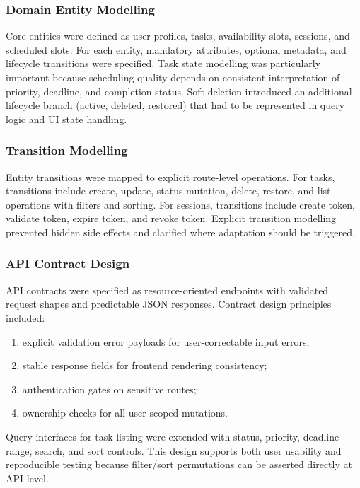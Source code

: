 \documentclass[12pt]{article}
\begin{document}
\subsubsection{Domain Entity Modelling}
Core entities were defined as user profiles, tasks, availability slots, sessions, and scheduled slots. For each entity, mandatory attributes, optional metadata, and lifecycle transitions were specified. Task state modelling was particularly important because scheduling quality depends on consistent interpretation of priority, deadline, and completion status. Soft deletion introduced an additional lifecycle branch (active, deleted, restored) that had to be represented in query logic and UI state handling.

\subsubsection{Transition Modelling}
Entity transitions were mapped to explicit route-level operations. For tasks, transitions include create, update, status mutation, delete, restore, and list operations with filters and sorting. For sessions, transitions include create token, validate token, expire token, and revoke token. Explicit transition modelling prevented hidden side effects and clarified where adaptation should be triggered.

\subsubsection{API Contract Design}
API contracts were specified as resource-oriented endpoints with validated request shapes and predictable JSON responses. Contract design principles included:
\begin{enumerate}
    \item explicit validation error payloads for user-correctable input errors;
    \item stable response fields for frontend rendering consistency;
    \item authentication gates on sensitive routes;
    \item ownership checks for all user-scoped mutations.
\end{enumerate}

Query interfaces for task listing were extended with status, priority, deadline range, search, and sort controls. This design supports both user usability and reproducible testing because filter/sort permutations can be asserted directly at API level.
\end{document}
